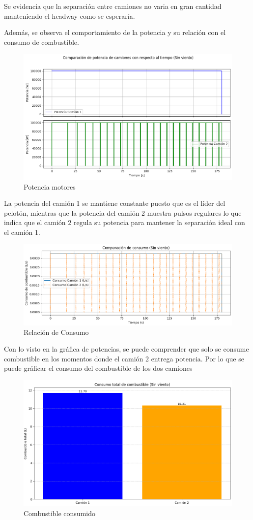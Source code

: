 \documentclass[11pt,stdletter,orderfromtodate,sigleft,twoside]{report}
\begin{document}
Se evidencia que la separación entre camiones no varia en gran cantidad manteniendo el headway como se esperaría.

Además, se observa el comportamiento de la potencia y su relación con el consumo de combustible.


\begin{figure}[H]
    \centering
    \includegraphics[width=0.75\linewidth]{figures//Cars/Pot 2 trucks .png}
    \caption{Potencia motores}
    \label{fig:enter-label}
\end{figure}

La potencia del camión 1 se mantiene constante puesto que es el líder del pelotón, mientras que la potencia del camión 2 muestra pulsos regulares lo que indica que el camión 2 regula su potencia para mantener la separación ideal con el camión 1. 

\begin{figure}[H]
    \centering
    \includegraphics[width=0.75\linewidth]{figures//Cars/comp consu truck 2.png}
    \caption{Relación de Consumo}
    \label{fig:enter-label}
\end{figure}

Con lo visto en la gráfica de potencias, se puede comprender que solo se consume combustible en los momentos donde el camión 2 entrega potencia. Por lo que se puede gráficar el consumo del combustible de los dos camiones

\begin{figure}[H]
    \centering
    \includegraphics[width=0.55\linewidth]{figures//Cars/Consum combus truck 2.png}
    \caption{Combustible consumido}
    \label{fig:enter-label}
\end{figure}
\end{document}
